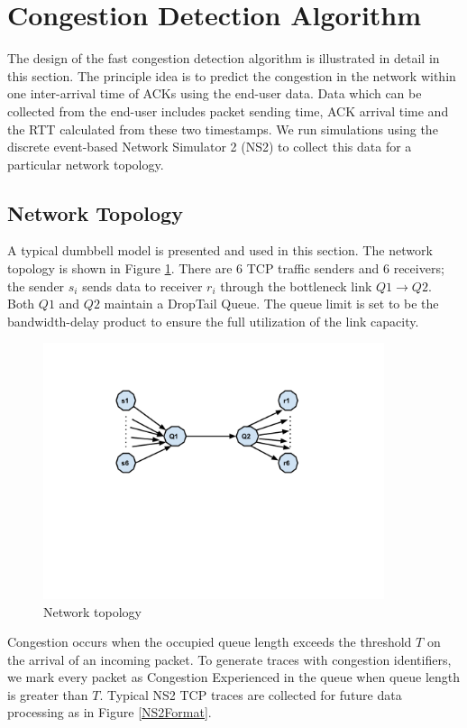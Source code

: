 \section{Congestion Detection Algorithm}
\label{Design}
The design of the fast congestion detection algorithm is illustrated in detail in this section. The principle idea is to predict the congestion in the network within one inter-arrival time of ACKs using the end-user data. Data which can be collected from the end-user includes packet sending time, ACK arrival time and the RTT calculated from these two timestamps. We run simulations using the discrete event-based Network Simulator 2 (NS2) \cite{NS2} to collect this data for a particular network topology. 
\subsection{Network Topology}
A typical dumbbell model is presented and used in this section. The network topology is shown in Figure \ref{layout}. There are $6$ TCP traffic senders and $6$ receivers; the sender $s_{i}$ sends data to receiver $r_{i}$ through the bottleneck link $Q1\to Q2$. Both $Q1$ and $Q2$ maintain a DropTail Queue. The queue limit is set to be the bandwidth-delay product to ensure the full utilization of the link capacity.

\begin{figure}
\centering
\includegraphics[width=10cm]{6layout.pdf}
\caption{Network topology}
\label{layout}
\end{figure}
Congestion occurs when the occupied queue length exceeds the threshold $T$ on the arrival of an incoming packet. To generate traces with congestion identifiers, we mark every packet as Congestion Experienced in the queue when queue length is greater than $T$. Typical NS2 TCP traces  \cite{TraceFormat} are collected for future data processing as in Figure \ref{NS2Format}. 

